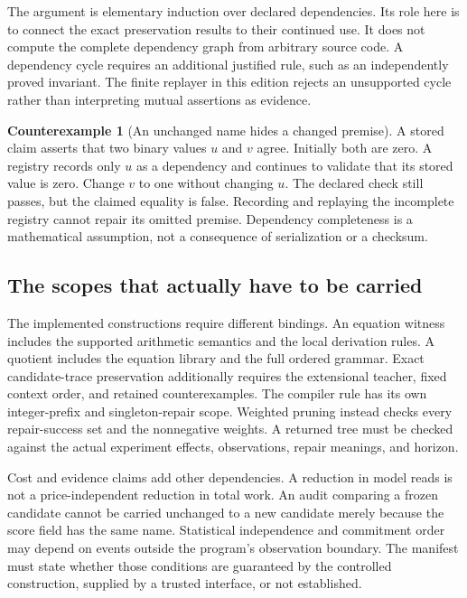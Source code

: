 \documentclass[11pt,letterpaper]{article}
\theoremstyle{plain}
\theoremstyle{definition}
\newtheorem{counterexample}[theorem]{Counterexample}
\begin{document}
The argument is elementary induction over declared dependencies. Its role here is to connect the exact preservation results to their continued use. It does not compute the complete dependency graph from arbitrary source code. A dependency cycle requires an additional justified rule, such as an independently proved invariant. The finite replayer in this edition rejects an unsupported cycle rather than interpreting mutual assertions as evidence.

\begin{counterexample}[An unchanged name hides a changed premise]\label{ex:incomplete-dependency}
A stored claim asserts that two binary values $u$ and $v$ agree. Initially both are zero. A registry records only $u$ as a dependency and continues to validate that its stored value is zero. Change $v$ to one without changing $u$. The declared check still passes, but the claimed equality is false. Recording and replaying the incomplete registry cannot repair its omitted premise. Dependency completeness is a mathematical assumption, not a consequence of serialization or a checksum.
\end{counterexample}

\subsection{The scopes that actually have to be carried}
The implemented constructions require different bindings. An equation witness includes the supported arithmetic semantics and the local derivation rules. A quotient includes the equation library and the full ordered grammar. Exact candidate-trace preservation additionally requires the extensional teacher, fixed context order, and retained counterexamples. The compiler rule has its own integer-prefix and singleton-repair scope. Weighted pruning instead checks every repair-success set and the nonnegative weights. A returned tree must be checked against the actual experiment effects, observations, repair meanings, and horizon.

Cost and evidence claims add other dependencies. A reduction in model reads is not a price-independent reduction in total work. An audit comparing a frozen candidate cannot be carried unchanged to a new candidate merely because the score field has the same name. Statistical independence and commitment order may depend on events outside the program's observation boundary. The manifest must state whether those conditions are guaranteed by the controlled construction, supplied by a trusted interface, or not established.
\end{document}
